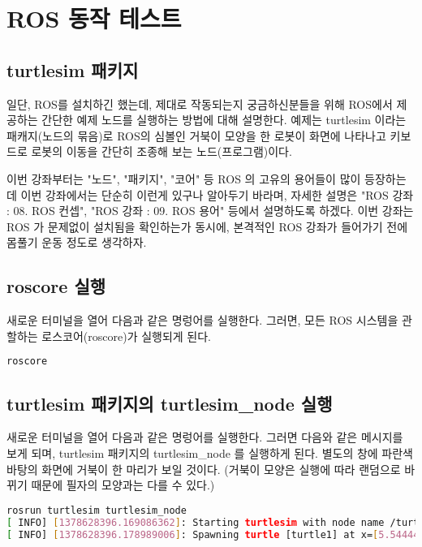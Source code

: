 \section{ROS 동작 테스트}

\subsection{turtlesim 패키지}
일단, ROS를 설치하긴 했는데, 제대로 작동되는지 궁금하신분들을 위해 ROS에서 제공하는 간단한 예제 노드를 실행하는 방법에 대해 설명한다. 예제는 turtlesim 이라는 패캐지(노드의 묶음)로 ROS의 심볼인 거북이 모양을 한 로봇이 화면에 나타나고 키보드로 로봇의 이동을 간단히 조종해 보는 노드(프로그램)이다.

이번 강좌부터는 "노드", "패키지", "코어" 등 ROS 의 고유의 용어들이 많이 등장하는데 이번 강좌에서는 단순히 이런게 있구나 알아두기 바라며, 자세한 설명은 "ROS 강좌 : 08. ROS 컨셉", "ROS 강좌 : 09. ROS 용어" 등에서 설명하도록 하겠다. 이번 강좌는 ROS 가 문제없이 설치됨을 확인하는가 동시에, 본격적인 ROS 강좌가 들어가기 전에 몸풀기 운동 정도로 생각하자.

\subsection{roscore 실행}
새로운 터미널을 열어 다음과 같은 명렁어를 실행한다. 그러면, 모든 ROS 시스템을 관할하는 로스코어(roscore)가 실행되게 된다.

\begin{lstlisting}[language=bash]
roscore
\end{lstlisting}

\subsection{turtlesim 패키지의 turtlesim\_node 실행}
새로운 터미널을 열어 다음과 같은 명렁어를 실행한다. 그러면 다음와 같은 메시지를 보게 되며, turtlesim 패키지의 turtlesim\_node 를 실행하게 된다. 별도의 창에 파란색 바탕의 화면에 거북이 한 마리가 보일 것이다. (거북이 모양은 실행에 따라 랜덤으로 바뀌기 때문에 필자의 모양과는 다를 수 있다.)

\begin{lstlisting}[language=bash]
rosrun turtlesim turtlesim_node
[ INFO] [1378628396.169086362]: Starting turtlesim with node name /turtlesim
[ INFO] [1378628396.178989006]: Spawning turtle [turtle1] at x=[5.544445], y=[5.544445], theta=[0.000000]
\end{lstlisting}

